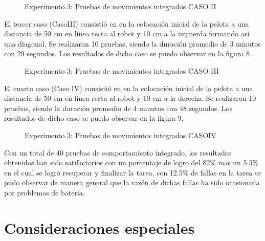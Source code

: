 \documentclass[tikz,conference, letterpaper]{IEEEtranMC1}
\begin{document}
\begin{figure}
\caption{Experimento 3: Pruebas de movimientos integrados CASO II}
\end{figure}

El tercer caso  (CasoIII) consistió en en la colocación inicial de la pelota a una distancia de 50 cm en línea recta al robot y 10 cm a la izquierda formando asi una diagonal. Se realizaron 10 pruebas, siendo la duración promedio de 3 minutos con 29 segundos. Los resultados de dicho caso se puedo observar en la figura 8. 

\begin{figure}
\caption{Experimento 3: Pruebas de movimientos integrados CASO III}
\end{figure}

El cuarto caso  (Caso IV) consistió en en la colocación inicial de la pelota a una distancia de 50 cm en línea recta al robot y 10 cm a la derecha. Se realizaron 10 pruebas, siendo la duración promedio de 4 minutos con 48 segundos.  Los resultados de dicho caso se puedo observar en la figura 9. 

\begin{figure}
\caption{Experimento 3: Pruebas de movimientos integrados CASOIV}
\end{figure} 

Con un total de 40 pruebas de comportamiento integrado, los resultados obtenidos han sido satifactorios con un porcentaje de logro del 82\% mas un 5.5\% en el cual se logró recuperar y finalizar la tarea, con 12.5\% de fallas en la tarea se pudo observar de manera general que la razón de dichas fallas ha sido ocasionada por problemas de batería. 

\section{Consideraciones especiales}
\label{sec:consideraciones}
\end{document}
